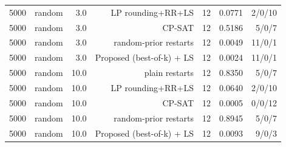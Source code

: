 \begin{table}[t]
\begin{tabular}{llrrrrr}
5000 & random & 3.0 & LP rounding+RR+LS & 12 & 0.0771 & 2/0/10 \\
5000 & random & 3.0 & CP-SAT & 12 & 0.5186 & 5/0/7 \\
5000 & random & 3.0 & random-prior restarts & 12 & 0.0049 & 11/0/1 \\
5000 & random & 3.0 & Proposed (best-of-k) + LS & 12 & 0.0024 & 11/0/1 \\
5000 & random & 10.0 & plain restarts & 12 & 0.8350 & 5/0/7 \\
5000 & random & 10.0 & LP rounding+RR+LS & 12 & 0.0640 & 2/0/10 \\
5000 & random & 10.0 & CP-SAT & 12 & 0.0005 & 0/0/12 \\
5000 & random & 10.0 & random-prior restarts & 12 & 0.8945 & 5/0/7 \\
5000 & random & 10.0 & Proposed (best-of-k) + LS & 12 & 0.0093 & 9/0/3 \\
\bottomrule
\end{tabular}
\end{table}
